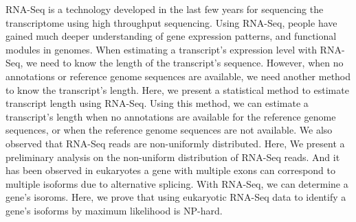 
\begin{eabstract} 
	RNA-Seq is a technology developed in the last few years for sequencing the transcriptome using high throughput sequencing. 
	Using RNA-Seq, people have gained much deeper understanding of gene expression patterns, 
	and functional modules in genomes. 
	When estimating a transcript's expression level with RNA-Seq, 
	we need to know the length of the transcript's sequence. 
	However, when no annotations or reference genome sequences are available, 
	we need another method to know the transcript's length. 
	Here, we present a statistical method to estimate transcript length using RNA-Seq. 
	Using this method, we can estimate a transcript's length when no annotations are available for the reference genome sequences, or when the reference genome sequences are not available. 
	We also observed that RNA-Seq reads are non-uniformly distributed. 
	Here, We present a preliminary analysis on the non-uniform distribution of RNA-Seq reads. 
	And it has been observed in eukaryotes a gene with multiple exons can correspond to multiple isoforms due to alternative splicing. With RNA-Seq, we can determine a gene's isoroms. 
	Here, we prove that using eukaryotic RNA-Seq data to identify a gene's isoforms by maximum likelihood is NP-hard.
\end{eabstract}




